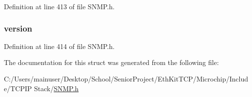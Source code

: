 Definition at line 413 of file S\+N\+M\+P.\+h.

\hypertarget{struct_s_n_m_p_n_o_n_m_i_b_r_e_c_d_i_n_f_o_ac7d72c643c27497c3c55313c620a2f25}{}
\subsubsection[{version}]{ version}\label{struct_s_n_m_p_n_o_n_m_i_b_r_e_c_d_i_n_f_o_ac7d72c643c27497c3c55313c620a2f25}


Definition at line 414 of file S\+N\+M\+P.\+h.



The documentation for this struct was generated from the following file\+:\begin{DoxyCompactItemize}
\item 
C\+:/\+Users/mainuser/\+Desktop/\+School/\+Senior\+Project/\+Eth\+Kit\+T\+C\+P/\+Microchip/\+Include/\+T\+C\+P\+I\+P Stack/\hyperlink{_s_n_m_p_8h}{S\+N\+M\+P.\+h}\end{DoxyCompactItemize}
